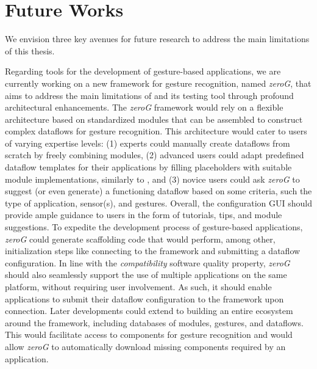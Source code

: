 \section{Future Works}
\label{sec:conclusion:limitations-and-future-works}
We envision three key avenues for future research to address the main limitations of this thesis.

Regarding tools for the development of gesture-based applications, we are currently working on a new framework for gesture recognition, named \textit{zeroG}, that aims to address the main limitations of \ql and its testing tool through profound architectural enhancements.
%
The \textit{zeroG} framework would rely on a flexible architecture based on standardized modules that can be assembled to construct complex dataflows for gesture recognition. 
%
This architecture would cater to users of varying expertise levels: (1) experts could manually create dataflows from scratch by freely combining modules, (2) advanced users could adapt predefined dataflow templates for their applications by filling placeholders with suitable module implementations, similarly to \ql, and (3) novice users could ask \textit{zeroG} to suggest (or even generate) a functioning dataflow based on some criteria, such the type of application, sensor(s), and gestures.
%
Overall, the configuration GUI should provide ample guidance to users in the form of tutorials, tips, and module suggestions. 
%
To expedite the development process of gesture-based applications, \textit{zeroG} could generate scaffolding code that would perform, among other, initialization steps like connecting to the framework and submitting a dataflow configuration.
%
In line with the \textit{compatibility} software quality property, \textit{zeroG} should also seamlessly support the use of multiple applications on the same platform, without requiring user involvement. As such, it should enable applications to submit their dataflow configuration to the framework upon connection.
%
Later developments could extend to building an entire ecosystem around the framework, including databases of modules, gestures, and dataflows. This would facilitate access to components for gesture recognition and would allow \textit{zeroG} to automatically download missing components required by an application.


